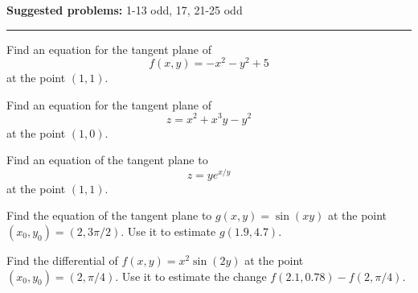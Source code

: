 \documentclass[12pt,reqno]{amsart}
\begin{document}
\textbf{Suggested problems:} 1-13 odd, 17, 21-25 odd

\bigskip
\hrule

\medskip

\prob Find an equation for the tangent plane of
	\[f(x,y) = -x^2-y^2+5
	\]
at the point $(1,1)$.

\vfill
\prob Find an equation for the tangent plane of
	\[z = x^2+x^3y-y^2
	\]	
at the point $(1,0)$.

\vfill
\prob Find an equation of the tangent plane to
	\[z = y e^{x/y}
	\]
at the point $(1,1)$.

\vfill
\newpage
\prob Find the equation of the tangent plane to $g(x,y)=\sin{(xy)}$ at the point $(x_0,y_0) = (2,3\pi/2)$. Use it to estimate $g(1.9,4.7)$.

\vfill
\prob Find the differential of $f(x,y) = x^2 \sin{(2y)}$ at the point $(x_0,y_0) = (2,\pi/4)$. Use it to estimate the change $f(2.1,0.78)-f(2,\pi/4)$.
\vfill
\end{document}
